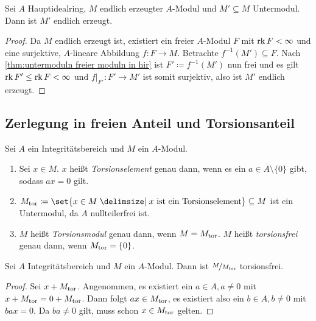 \documentclass[12pt,a4paper]{scrartcl}
\theoremstyle{cplain}
\theoremstyle{cdef}
\begin{document}
\begin{kor}
	Sei $A$ Hauptidealring, $M$ endlich erzeugter $A$-Modul und $M'\subseteq M$ Untermodul. Dann ist $M'$ endlich erzeugt.
\end{kor}
\begin{proof}
	Da $M$ endlich erzeugt ist, existiert ein freier $A$-Modul $F$ mit $\operatorname{rk} F<\infty$ und eine surjektive, $A$-lineare Abbildung $f\colon F\to M$. Betrachte $f^{-1}(M')\subseteq F$. Nach \cref{thm:untermoduln freier moduln in hir} ist $F'\coloneqq f^{-1}(M')$ nun frei und es gilt $\operatorname{rk} F'\leq \operatorname{rk} F <\infty$ und $f|_{F'}\colon F'\to M'$ ist somit surjektiv, also ist $M'$ endlich erzeugt.
\end{proof}


\subsection{Zerlegung in freien Anteil und Torsionsanteil}
\begin{defi}
	Sei $A$ ein Integritätsbereich und $M$ ein $A$-Modul.
	\begin{enumerate}
		\item Sei $x\in M$. $x$ heißt \emph{Torsionselement} genau dann, wenn es ein $a\in A\setminus\{0\}$ gibt, sodass $ax = 0$ gilt.
		\item $M_{\tor} \coloneqq \set{x\in M \given x \text{ ist ein Torsionselement}}\subseteq M$ ist ein Untermodul, da $A$ nullteilerfrei ist.
		\item $M$ heißt \emph{Torsionsmodul }genau dann, wenn $M = M_{\operatorname{tor}}$.
			  $M$ heißt \emph{torsionsfrei} genau dann, wenn $M_{\operatorname{tor}} = \{0\}$.
	\end{enumerate}
	
\end{defi}

\begin{lem} \label{lem:torsionsquotient torsionsfrei}
	Sei $A$ Integritätsbereich und $M$ ein $A$-Modul. Dann ist $\nicefrac{M}{M_{\operatorname{tor}}}$ torsionsfrei.
\end{lem}
\begin{proof}
	Sei $x+M_{\operatorname{tor}}$. Angenommen, es existiert ein $a\in A, a\neq 0$ mit $x+M_{\operatorname{tor}} = 0+M_{\operatorname{tor}}$. Dann folgt $ax\in M_{\operatorname{tor}}$, es existiert also ein $b\in A, b\neq 0$ mit $bax = 0$. Da $ba\neq 0$ gilt, muss schon $x\in M_{\operatorname{tor}}$ gelten.
\end{proof}
\end{document}

